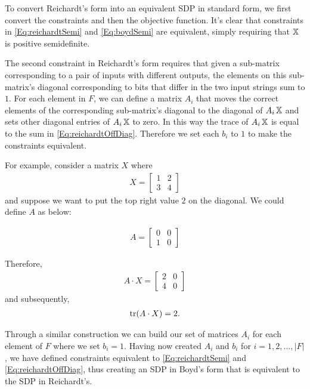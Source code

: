 To convert Reichardt's form into an
equivalent SDP in standard form, we first convert the
constraints and then the objective function. It's clear
that constraints in \cref{Eq:reichardtSemi} and 
\cref{Eq:boydSemi} are equivalent, simply requiring that
$\operatorname{\mathbb{X}}$ is positive semidefinite.

The second constraint in Reichardt's form requires that
given a sub-matrix corresponding to a pair of inputs with
different outputs, the elements on this sub-matrix's
diagonal corresponding to bits that differ in the two
input strings sum to $1$. For each element in $F$, we can
define a matrix $A_i$ that moves the correct elements of
the corresponding sub-matrix's diagonal to the diagonal
of $A_i \operatorname{\mathbb{X}}$ and sets other diagonal entries of $A_i \operatorname{\mathbb{X}}$
to zero. In this way the trace of $A_i \operatorname{\mathbb{X}}$ is equal to
the sum in \cref{Eq:reichardtOffDiag}. Therefore we set
each $b_i$ to $1$ to make the constraints equivalent.


For example, consider a matrix $X$ where
\begin{align}
    X = \left[ \begin{matrix} 1 & 2 \\ 3 & 4 \end{matrix} \right] \nonumber
\end{align}
and suppose we want to put the top right value $2$ on the diagonal.
We could define $A$ as below:

\begin{align}
    A = \left[ \begin{matrix} 0 & 0 \\ 1 & 0 \end{matrix} \right] \nonumber
\end{align}

Therefore,
\begin{align}
    A \cdot X = \left[ \begin{matrix} 2 & 0 \\ 4 & 0 \end{matrix} \right] \nonumber
\end{align}
and subsequently,
\begin{align}
    \operatorname{\text{tr}}(A \cdot X) = 2. \nonumber
\end{align}

Through a similar construction we can build our set of
matrices $A_i$ for each element of $F$ where we set $b_i
= 1$. Having now created $A_i$ and $b_i$ for $i = 1,2,..., |F|$, 
we have defined constraints equivalent to \cref{Eq:reichardtSemi}
and \cref{Eq:reichardtOffDiag}, thus creating an SDP 
in Boyd's form that is equivalent to the SDP in Reichardt's.

